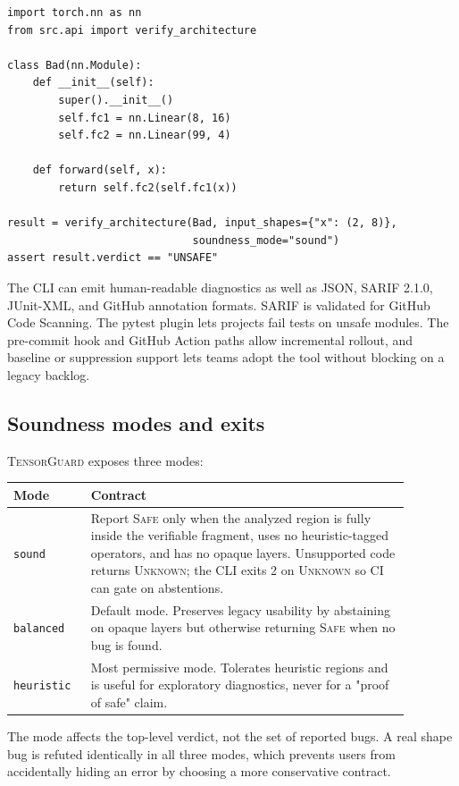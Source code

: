 \documentclass[11pt]{article}
\newcommand{\tg}{\textsc{TensorGuard}}
\newcommand{\safe}{\textsc{Safe}}
\newcommand{\unknown}{\textsc{Unknown}}
\begin{document}
\begin{lstlisting}
import torch.nn as nn
from src.api import verify_architecture

class Bad(nn.Module):
    def __init__(self):
        super().__init__()
        self.fc1 = nn.Linear(8, 16)
        self.fc2 = nn.Linear(99, 4)

    def forward(self, x):
        return self.fc2(self.fc1(x))

result = verify_architecture(Bad, input_shapes={"x": (2, 8)},
                             soundness_mode="sound")
assert result.verdict == "UNSAFE"
\end{lstlisting}

The CLI can emit human-readable diagnostics as well as JSON, SARIF 2.1.0,
JUnit-XML, and GitHub annotation formats.  SARIF is validated for GitHub Code
Scanning.  The pytest plugin lets projects fail tests on unsafe modules.  The
pre-commit hook and GitHub Action paths allow incremental rollout, and baseline
or suppression support lets teams adopt the tool without blocking on a legacy
backlog.

\subsection{Soundness modes and exits}

\tg{} exposes three modes:

\begin{center}
\begin{tabular}{p{0.16\linewidth} p{0.72\linewidth}}
\toprule
\textbf{Mode} & \textbf{Contract} \\
\midrule
\texttt{sound} & Report \safe{} only when the analyzed region is fully inside
the verifiable fragment, uses no heuristic-tagged operators, and has no opaque
layers.  Unsupported code returns \unknown{}; the CLI exits 2 on \unknown{} so
CI can gate on abstentions. \\
\texttt{balanced} & Default mode.  Preserves legacy usability by abstaining on
opaque layers but otherwise returning \safe{} when no bug is found. \\
\texttt{heuristic} & Most permissive mode.  Tolerates heuristic regions and is
useful for exploratory diagnostics, never for a "proof of safe" claim. \\
\bottomrule
\end{tabular}
\end{center}

The mode affects the top-level verdict, not the set of reported bugs.  A real
shape bug is refuted identically in all three modes, which prevents users from
accidentally hiding an error by choosing a more conservative contract.
\end{document}
